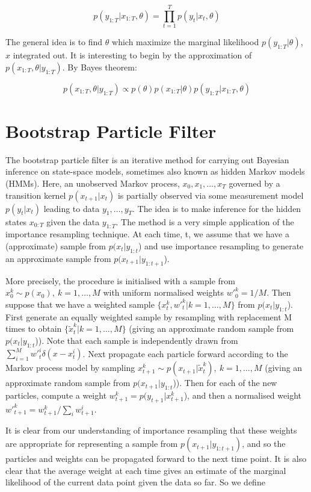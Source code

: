 \documentclass[11pt,a4,twosided,singlespacing,titlepagenumber=on]{scrreprt}
\numberwithin{equation}{chapter} %
\theoremstyle{remark}
\begin{document}
$$p(y_{1:T} | x_{1:T}, \theta) = \prod_{t=1}^T p(y_t | x_t, \theta) $$

The general idea is to find $\theta$ which maximize the marginal likelihood $p(y_{1:T}|\theta)$, $x$ integrated out. It is interesting to begin by the approximation of $p(x_{1:T}, \theta | y_{1:T})$. By Bayes theorem:

$$p(x_{1:T}, \theta | y_{1:T}) \propto p(\theta)p(x_{1:T}|\theta)p(y_{1:T}|x_{1:T}, \theta) $$



\section{Bootstrap Particle Filter}

The bootstrap particle filter is an iterative method for carrying out Bayesian inference on state-space models, sometimes also known as hidden Markov models (HMMs). Here, an unobserved Markov process, $x_0,x_1,\ldots,x_T$ governed by a transition kernel $p(x_{t+1}|x_t)$ is partially observed via some measurement model $p(y_t|x_t)$ leading to data $y_1,\ldots,y_T$. The idea is to make inference for the hidden states $x_{0:T}$ given the data $y_{1:T}$. The method is a very simple application of the importance resampling technique. At each time, t, we assume that we have a (approximate) sample from $p(x_t|y_{1:t}$) and use importance resampling to generate an approximate sample from $p(x_{t+1}|y_{1:t+1}$).

More precisely, the procedure is initialised with a sample from $x_0^k \sim p(x_0),\ k=1,\ldots,M$ with uniform normalised weights ${w'}_0^k=1/M$. Then suppose that we have a weighted sample $\{x_t^k,{w'}_t^k|k=1,\ldots,M\}$ from $p(x_t|y_{1:t}$). First generate an equally weighted sample by resampling with replacement M times to obtain $\{\tilde{x}_t^k|k=1,\ldots,M\}$ (giving an approximate random sample from $p(x_t|y_{1:t}$)). Note that each sample is independently drawn from $\sum_{i=1}^M {w'}_t^i\delta(x-x_t^i)$. Next propagate each particle forward according to the Markov process model by sampling $x_{t+1}^k\sim p(x_{t+1}|\tilde{x}_t^k),\ k=1,\ldots,M$ (giving an approximate random sample from $p(x_{t+1}|y_{1:t}$)). Then for each of the new particles, compute a weight $w_{t+1}^k=p(y_{t+1}|x_{t+1}^k$), and then a normalised weight ${w'}_{t+1}^k=w_{t+1}^k/\sum_i w_{t+1}^i$.

It is clear from our understanding of importance resampling that these weights are appropriate for representing a sample from $p(x_{t+1}|y_{1:t+1})$, and so the particles and weights can be propagated forward to the next time point. It is also clear that the average weight at each time gives an estimate of the marginal likelihood of the current data point given the data so far. So we define
\end{document}
